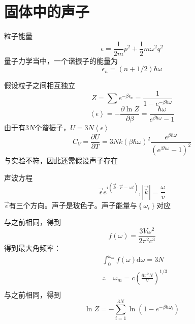 \documentclass[12pt, a4paper, oneside]{ctexbook}
\newcommand{\hl}[1]{\hlbox{#1}}
\newcounter{#2}
\newcounter{#2}[#1]
\numberwithin{#2}{#1}
\newcommand{\xkuo}[1]{\left(#1\right)}
\newcommand{\dkuo}[1]{\left\lbrace#1\right\rbrace}
\newcommand{\jkuo}[1]{\left\langle#1\right\rangle}
\newcommand{\pian}[2]{\frac{\partial #1}{\partial #2}}
\begin{document}
          \section{固体中的声子}
          \begin{claim}
            粒子能量
            \begin{equation}
              \epsilon=\frac{1}{2 m} p^2+\frac{1}{2} m \omega^2 q^2
            \end{equation}
            量子力学当中，一个谐振子的能量为
            \begin{equation}
              \epsilon_n=(n+1/2)\hbar\omega
            \end{equation}
          \end{claim}
          \begin{deduce}
            假设粒子之间相互独立
            \begin{equation}
              Z=\sum e^{-\beta\epsilon_n}=\frac{1}{1-e^{-\beta\hbar\omega}}
            \end{equation}
            \begin{equation}
              \jkuo{\epsilon}=-\pian{\ln Z}{\beta}=\frac{\hbar\omega}{e^{\beta\hbar\omega}-1}
            \end{equation}
            由于有\(3N\)个谐振子，\(U=3N\jkuo{\epsilon}\)
            \begin{equation}
              C_V=\pian{U}{T}=3Nk(\beta\hbar\omega)^2\frac{e^{\beta\hbar\omega}}{\xkuo{e^{\beta\hbar\omega}-1}^2}
            \end{equation}
            与实验不符，因此还需假设声子存在
          \end{deduce}
          \begin{claim}
            声波方程
            \begin{equation}
              \vec \epsilon e^{i(\vec k\cdot\vec r-\omega t)},|\vec k|=\frac\omega v
            \end{equation}
            \(\vec\epsilon\)有三个方向。声子是玻色子。声子能量与\(\dkuo{\omega_i}\)对应
          \end{claim}
          \begin{theorem}
            \hl{德拜理论}
            与之前相同，得到
            \begin{equation}
              f(\omega)=\frac{3V\omega^2}{2\pi^2c^3}
            \end{equation}
            得到最大角频率：
            \begin{equation}
              \begin{aligned}
                & \int_0^{\omega_m} f(\omega) \mathrm{d} \omega=3 N \\
                & \therefore \quad \omega_m=c\left(\frac{6 \pi^2 N}{V}\right)^{1 / 3} \\
                &
                \end{aligned}
            \end{equation}
            与之前相同，得到 
            \begin{equation}
              \ln Z=-\sum_{i=1 }^{3N}\ln(1-e^{-\beta\hbar\omega_i})
            \end{equation}
          \end{theorem}

          


          
          
        
\end{document}
